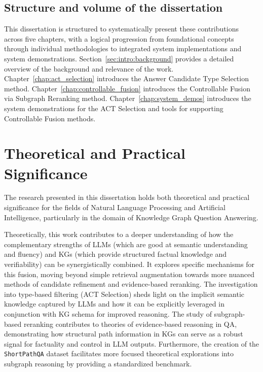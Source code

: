 \subsection{Structure and volume of the dissertation
}
This dissertation is structured to systematically present these contributions across five chapters, with a logical progression from foundational concepts through individual methodologies to integrated system implementations and system demonstrations. Section~\ref{sec:intro:background} provides a detailed overview of the background and relevance of the work. Chapter~\ref{chap:act_selection} introduces the Answer Candidate Type Selection method. Chapter~\ref{chap:controllable_fusion} introduces the Controllable Fusion via Subgraph Reranking method. Chapter~\ref{chap:system_demos} introduces the system demonstrations for the ACT Selection and tools for supporting Controllable Fusion methods.

\section{Theoretical and Practical Significance}
\label{sec:intro:significance}
The research presented in this dissertation holds both theoretical and practical significance for the fields of Natural Language Processing and Artificial Intelligence, particularly in the domain of Knowledge Graph Question Answering.

Theoretically, this work contributes to a deeper understanding of how the complementary strengths of LLMs (which are good at semantic understanding and fluency) and KGs (which provide structured factual knowledge and verifiability) can be synergistically combined. It explores specific mechanisms for this fusion, moving beyond simple retrieval augmentation towards more nuanced methods of candidate refinement and evidence-based reranking. The investigation into type-based filtering (ACT Selection) sheds light on the implicit semantic knowledge captured by LLMs and how it can be explicitly leveraged in conjunction with KG schema for improved reasoning. The study of subgraph-based reranking contributes to theories of evidence-based reasoning in QA, demonstrating how structural path information in KGs can serve as a robust signal for factuality and control in LLM outputs. Furthermore, the creation of the \texttt{ShortPathQA} dataset facilitates more focused theoretical explorations into subgraph reasoning by providing a standardized benchmark.

